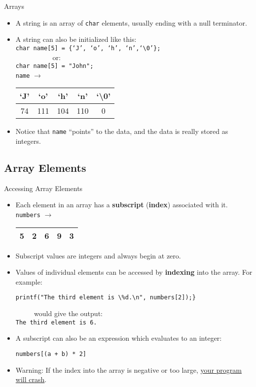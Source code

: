 \documentclass[graphics]{beamer}
\begin{document}
\begin{frame}{Arrays}
{\begin{itemize}
            \item A string is an array of \texttt{char} elements, usually ending with a null terminator.
            \item A string can also be initialized like this:\\ \texttt{char name[5] = \{`J', `o', `h', `n',`\textbackslash0'\};} \\ ~~ ~~ ~~ ~~ or: \\
            \texttt{char name[5] = "John";} \\
            \texttt{name} $\rightarrow$
            \begin{tabular}{|c|c|c|c|c|}
                \hline
                `J' & `o' & `h' & `n' & `\textbackslash0' \\
                \hline
                74 & 111 & 104 & 110 & 0 \\
                \hline
            \end{tabular}
            \item Notice that \texttt{name} ``points'' to the data, and the data is really stored as integers.
        \end{itemize}
    }
\end{frame}

\subsection{Array Elements}
\begin{frame}[fragile]{Accessing Array Elements}
    \begin{itemize}
        \item Each element in an array has a \textbf{subscript} (\textbf{index}) associated with it.
        \texttt{numbers} $\rightarrow$
        \begin{tabular}{|c|c|c|c|c|}
            \hline
            5 & 2 & 6 & 9 & 3 \\
            \hline
        \end{tabular}
        \item Subscript values are integers and always begin at zero.
        \item Values of individual elements can be accessed by \textbf{indexing} into the array. For example: 
        \begin{verbatim}
printf("The third element is \%d.\n", numbers[2]);}\end{verbatim} ~~ ~~ would give the output: \\
        \texttt{The third element is 6.}
        \item A subscript can also be an expression which evaluates to an integer:
        \begin{verbatim}
numbers[(a + b) * 2]\end{verbatim}
        \item Warning: If the index into the array is negative or too large, \underline{your program will crash}.
    \end{itemize}
\end{frame}
\end{document}
